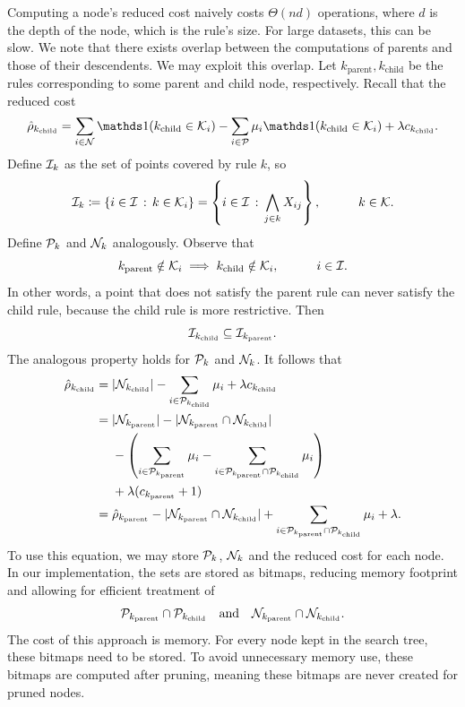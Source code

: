 Computing a node's reduced cost naively costs $\Theta(nd)$ operations,
where $d$ is the depth of the node, which is the rule's size.
For large datasets, this can be slow.
We note that there exists overlap between the computations of parents and those of their descendents.
We may exploit this overlap.
Let $k_\text{parent}, k_\text{child}$ be the rules corresponding to some parent and child node, respectively.
Recall that the reduced cost
\begin{equation}
        \hat \rho_{k_\text{child}} =  \sum_{i \in \cN} \Ind(k_\text{child} \in \K_i)
    -\sum_{i \in \cP}  \mu_i  \Ind(k_\text{child} \in \K_i) +\lambda  c_{k_\text{child}}.  \label{eq:BP_redcost_node}
\end{equation}
Define $\I_k$ as the set of points covered by rule $k$, so
\begin{equation}
    \I_k \coloneqq \{i \in \I \fw k \in \K_i\} = \left\{i \in \I \fw \bigwedge_{j \in k} X_{ij}\right\}, \tquad k \in \K.\label{eq:boolean_I_k}
\end{equation}
Define $\P_k$ and $ \N_k$ analogously.
Observe that
\[k_\text{parent} \notin \K_i \implies k_\text{child} \notin \K_i, \tquad i \in \I.\]
In other words, a point that does not satisfy the parent rule can never satisfy the child rule,
because the child rule is more restrictive.
Then
\[
    \I_{k_\text{child}} \subseteq \I_{k_\text{parent}}.
\]
The analogous property holds for $\P_k$ and $\N_k$.
It follows that
\begin{equation}
    \begin{split}
        \hat \rho_{k_\text{child}} = \; &  |\cN_{k_\text{child}}|
    -\sum_{i \in \cP_{k_\text{child}}}  \mu_i +\lambda c_{k_\text{child}} \\
        = \; & |\cN_{k_\text{parent}}| - |\cN_{k_\text{parent}} \cap \N_{k_\text{child}}| \\
    & -\left(\sum_{i \in \cP_{k_\text{parent}}} \mu_i - \sum_{i \in \cP_{k_\text{parent}} \cap \P_{k_\text{child}}} \mu_i \right) \\
        & +\lambda (c_{k_\text{parent}}+1) \\
        = \; & \hat{\rho}_{k_\text{parent}} - |\cN_{k_\text{parent}} \cap \N_{k_\text{child}}|
        + \sum_{i \in \cP_{k_\text{parent}}\cap \P_{k_\text{child}}} \mu_i
        + \lambda.
    \end{split}
    \label{eq:BP_redcost_node_deriv}
\end{equation}
To use this equation, we may store $\P_k$, $\N_k$ and the reduced cost for each node.
In our implementation, the sets are stored as bitmaps, reducing memory footprint and allowing for efficient treatment of
\[\cP_{k_\text{parent}} \cap \P_{k_\text{child}} \quad \text{and} \quad \N_{k_\text{parent}} \cap \N_{k_\text{child}}.\]
The cost of this approach is memory.
For every node kept in the search tree, these bitmaps need to be stored.
To avoid unnecessary memory use, these bitmaps are computed after pruning,
meaning these bitmaps are never created for pruned nodes.

